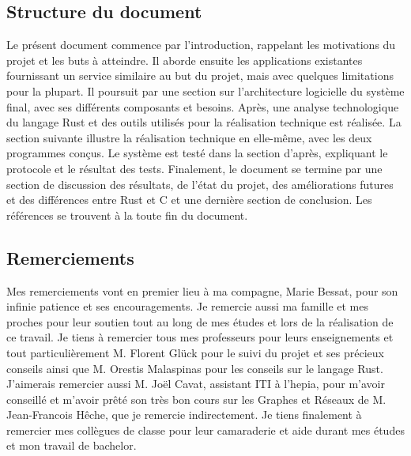 \documentclass[a4paper, 12pt]{article}
\begin{document}
\subsection*{Structure du document} %
Le présent document commence par l'introduction, rappelant les motivations du projet et les buts à 
atteindre. Il aborde ensuite les applications existantes fournissant un service similaire au but du 
projet, mais avec quelques limitations pour la plupart. Il poursuit par une section sur l'architecture 
logicielle du système final, avec ses différents composants et besoins. Après, une analyse technologique du 
langage Rust et des outils utilisés pour la réalisation technique est réalisée. La section suivante illustre 
la réalisation technique en elle-même, avec les deux programmes conçus. Le système est testé dans 
la section d'après, expliquant le protocole et le résultat des tests. Finalement, le document se 
termine par une section de discussion des résultats, de l'état du projet, des améliorations futures 
et des différences entre Rust et C et une dernière section de conclusion. Les références se trouvent à 
la toute fin du document.

\subsection*{Remerciements} %
Mes remerciements vont en premier lieu à ma compagne, Marie Bessat, pour son infinie patience et ses encouragements.
Je remercie aussi ma famille et mes proches pour leur soutien tout au long de mes études et 
lors de la réalisation de ce travail. Je tiens à remercier tous mes professeurs pour leurs 
enseignements et tout particulièrement M. Florent Glück pour le suivi du projet et ses précieux 
conseils ainsi que M. Orestis Malaspinas pour les conseils sur le langage Rust. J'aimerais remercier aussi 
M. Joël Cavat, assistant ITI à l'hepia, pour m'avoir conseillé et m'avoir prêté son très bon 
cours sur les Graphes et Réseaux de M. Jean-Francois Hêche, que je remercie indirectement. 
Je tiens finalement à remercier mes collègues de classe pour leur camaraderie et aide durant mes 
études et mon travail de bachelor.

\newpage
\end{document}

